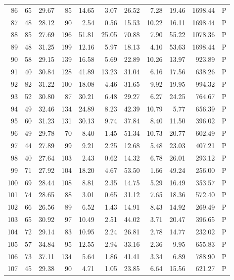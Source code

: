 \begin{table}[ht]
\begin{tabular}{rrrrrrrrrrl}
  86 &  65 & 29.67 &  85 & 14.65 & 3.07 & 26.52 & 7.28 & 19.46 & 1698.44 & P \\ 
  87 &  48 & 28.12 &  90 & 2.54 & 0.56 & 15.53 & 10.22 & 16.11 & 1698.44 & P \\ 
  88 &  85 & 27.69 & 196 & 51.81 & 25.05 & 70.88 & 7.90 & 55.22 & 1078.36 & P \\ 
  89 &  48 & 31.25 & 199 & 12.16 & 5.97 & 18.13 & 4.10 & 53.63 & 1698.44 & P \\ 
  90 &  58 & 29.15 & 139 & 16.58 & 5.69 & 22.89 & 10.26 & 13.97 & 923.89 & P \\ 
  91 &  40 & 30.84 & 128 & 41.89 & 13.23 & 31.04 & 6.16 & 17.56 & 638.26 & P \\ 
  92 &  82 & 31.22 & 100 & 18.08 & 4.46 & 31.65 & 9.92 & 19.95 & 994.32 & P \\ 
  93 &  52 & 30.80 &  87 & 30.21 & 6.48 & 29.27 & 6.27 & 24.25 & 764.67 & P \\ 
  94 &  49 & 32.46 & 134 & 24.89 & 8.23 & 42.39 & 10.79 & 5.77 & 656.39 & P \\ 
  95 &  60 & 31.23 & 131 & 30.13 & 9.74 & 37.84 & 8.40 & 11.50 & 396.02 & P \\ 
  96 &  49 & 29.78 &  70 & 8.40 & 1.45 & 51.34 & 10.73 & 20.77 & 602.49 & P \\ 
  97 &  44 & 27.89 &  99 & 9.21 & 2.25 & 12.68 & 5.48 & 23.03 & 407.21 & P \\ 
  98 &  40 & 27.64 & 103 & 2.43 & 0.62 & 14.32 & 6.78 & 26.01 & 293.12 & P \\ 
  99 &  71 & 27.92 & 104 & 18.20 & 4.67 & 53.50 & 1.66 & 49.24 & 256.00 & P \\ 
  100 &  69 & 28.44 & 108 & 8.81 & 2.35 & 14.75 & 5.29 & 16.49 & 353.57 & P \\ 
  101 &  74 & 28.65 &  88 & 3.01 & 0.65 & 31.12 & 7.65 & 18.36 & 572.40 & P \\ 
  102 &  66 & 26.56 &  89 & 6.52 & 1.43 & 14.91 & 8.43 & 14.92 & 269.49 & P \\ 
  103 &  65 & 30.92 &  97 & 10.49 & 2.51 & 44.02 & 3.71 & 20.47 & 396.65 & P \\ 
  104 &  72 & 29.14 &  83 & 10.95 & 2.24 & 26.81 & 2.78 & 14.77 & 232.02 & P \\ 
  105 &  57 & 34.84 &  95 & 12.55 & 2.94 & 33.16 & 2.36 & 9.95 & 655.83 & P \\ 
  106 &  73 & 37.11 & 134 & 5.64 & 1.86 & 41.41 & 3.34 & 6.89 & 788.90 & P \\ 
  107 &  45 & 29.38 &  90 & 4.71 & 1.05 & 23.85 & 6.64 & 15.56 & 621.27 & P \\ 

\end{tabular}
\end{table}
